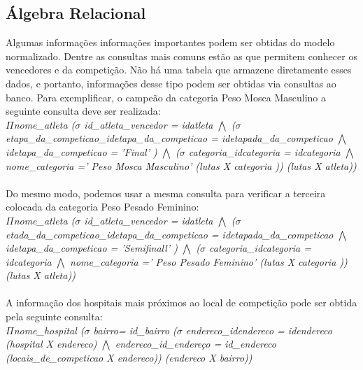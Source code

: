 \documentclass[10pt]{article}
\begin{document}
\begin{multicols}{2}
\subsection{Álgebra Relacional}
Algumas informações informações importantes podem ser obtidas do modelo normalizado. Dentre as consultas mais comuns estão as que permitem conhecer os vencedores e da competição. Não há uma tabela que armazene diretamente esses dados, e portanto, informações desse tipo podem ser obtidas via consultas ao banco. Para exemplificar, o campeão da categoria Peso Mosca Masculino a seguinte consulta deve ser realizada:
\\
 \emph{$\Pi$nome\_atleta ($\sigma$ id\_atleta\_vencedor = idatleta $\bigwedge$  ($\sigma$ etapa\_da\_competicao\_idetapa\_da\_competicao = idetapada\_da\_competicao $\bigwedge$ idetapa\_da\_competicao = 'Final' ) $\bigwedge$ ($\sigma$ categoria\_idcategoria = idcategoria $\bigwedge$ nome\_categoria =' Peso Mosca Masculino' (lutas X categoria )) (lutas X atleta))}
\\ \\
Do mesmo modo, podemos usar a mesma consulta para verificar a terceira colocada da categoria Peso Pesado Feminino: 
\\
 \emph{$\Pi$nome\_atleta ($\sigma$ id\_atleta\_vencedor = idatleta $\bigwedge$ ($\sigma$ etada\_da\_competicao\_idetapa\_da\_competicao = idetapada\_da\_competicao $\bigwedge$ idetapa\_da\_competicao = 'Semifinall' ) $\bigwedge$ ($\sigma$ categoria\_idcategoria = idcategoria $\bigwedge$ nome\_categoria =' Peso Pesado Feminino' (lutas X categoria )) (lutas X atleta))}
\\ \\
 A informação dos hospitais mais próximos ao local de competição pode ser obtida pela seguinte consulta:
\\ 
\emph{ $\Pi$nome\_hospital  ($\sigma$  bairro= id\_bairro ($\sigma$ endereco\_idendereco = idendereco (hospital X endereco) $\bigwedge$ endereco\_id\_endereço = id\_endereco (locais\_de\_competicao X endereco)) (endereco X bairro))} 


\end{multicols}
\end{document}
